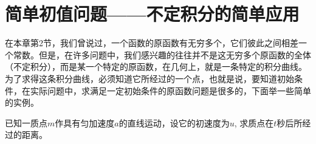 \begin{example}
    
\end{example}

\begin{solution}
    
\end{solution}



\begin{example}
    
\end{example}

\begin{solution}
    
\end{solution}



\begin{example}
    
\end{example}

\begin{solution}
    
\end{solution}

\section{简单初值问题——不定积分的简单应用}

在本章第2节，我们曾说过，一个函数的原函数有无穷多个，它们彼此之间相差一个常数。但是，在许多问题中，我们感兴趣的往往并不是这无穷多个原函数的全体（不定积分），而是某一个特定的原函数，在几何上，就是一条特定的积分曲线。为了求得这条积分曲线，必须知道它所经过的一个点，也就是说，要知道初始条件，在实际问题中，求满足一定初始条件的原函数问题是很多的，下面举一些简单的实例。

\begin{example}
    已知一质点$m$作具有匀加速度$a$的直线运动，设它的初速度为$u$, 求质点在$t$秒后所经过的距离。
\end{example}
















































